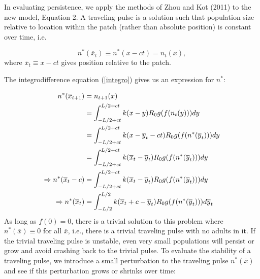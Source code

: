 \documentclass[12pt,english]{article}
\begin{document}
In evaluating persistence, we apply the methods of Zhou and Kot (2011) to the new model, Equation 2.  A traveling pulse is a solution such that population size relative to location within the patch (rather than absolute position) is constant over time, i.e. 

\begin{equation*}
n^*(\overline{x}_t)\equiv n^*(x-ct)=n_t(x),   \label{trav} 
\end{equation*}
where $\overline{x}_t\equiv x-ct$ gives position relative to the patch. 

The integrodifference equation (\ref{integro}) gives us an expression for $n^*$:

\begin{align}
n^*(\overline{x}_{t+1})&=n_{t+1}(x) \notag
\\ &=\int_{-L/2+ct}^{L/2+ct}k(x-y)R_0g(f(n_t(y)))dy \notag
\\ &=\int_{-L/2+ct}^{L/2+ct}k(x-\overline{y}_t-ct)R_0g(f(n^*(\overline{y}_t)))dy \notag
\\ &=\int_{-L/2+ct}^{L/2+ct}k(\overline{x}_t-\overline{y}_t)R_0g(f(n^*(\overline{y}_t)))dy \notag
\\ \Rightarrow n^*(\overline{x}_t-c)&=\int_{-L/2+ct}^{L/2+ct}k(\overline{x}_t-\overline{y}_t)R_0g(f(n^*(\overline{y}_t)))dy \notag
\\ \Rightarrow n^*(\overline{x}_t)&=\int_{-L/2}^{L/2}k(\overline{x}_t+c-\overline{y}_t)R_0g(f(n^*(\overline{y}_t)))d\overline y_t  \label{pulse}
\end{align}
As long as $f(0)=0$, there is a trivial solution to this problem where $n^*(\overline{x})\equiv 0$ for all $\overline{x}$, i.e., there is a trivial traveling pulse with no adults in it.  If the trivial traveling pulse is unstable, even very small populations will persist or grow and avoid crashing back to the trivial pulse.  To evaluate the stability of a traveling pulse, we introduce a small perturbation to the traveling pulse $n^*(\overline{x})$ and see if this perturbation grows or shrinks over time:
\end{document}
